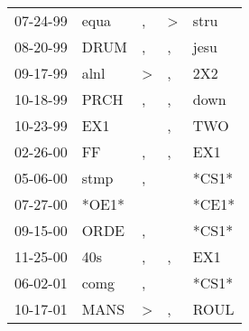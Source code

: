 \begin{supertabular}{p{0.07\textwidth}p{0.06\textwidth}p{0.02\textwidth}p{0.02\textwidth}p{0.06\textwidth}}
 07-24-99\textsuperscript{} &  equa\textsuperscript{} &             , &  \textgreater &  stru\textsuperscript{} \\
 08-20-99\textsuperscript{} &  DRUM\textsuperscript{} &             , &             , &  jesu\textsuperscript{} \\
 09-17-99\textsuperscript{} &  alnl\textsuperscript{} &  \textgreater &             , &   2X2\textsuperscript{} \\
 10-18-99\textsuperscript{} &  PRCH\textsuperscript{} &             , &             , &  down\textsuperscript{} \\
 10-23-99\textsuperscript{} &   EX1\textsuperscript{} &               &             , &   TWO\textsuperscript{} \\
 02-26-00\textsuperscript{} &    FF\textsuperscript{} &             , &             , &   EX1\textsuperscript{} \\
 05-06-00\textsuperscript{} &  stmp\textsuperscript{} &             , &               &                   *CS1* \\
 07-27-00\textsuperscript{} &                   *OE1* &               &               &                   *CE1* \\
 09-15-00\textsuperscript{} &  ORDE\textsuperscript{} &             , &               &                   *CS1* \\
 11-25-00\textsuperscript{} &   40s\textsuperscript{} &             , &             , &   EX1\textsuperscript{} \\
 06-02-01\textsuperscript{} &  comg\textsuperscript{} &             , &               &                   *CS1* \\
 10-17-01\textsuperscript{} &  MANS\textsuperscript{} &  \textgreater &             , &  ROUL\textsuperscript{} \\
\end{supertabular}
